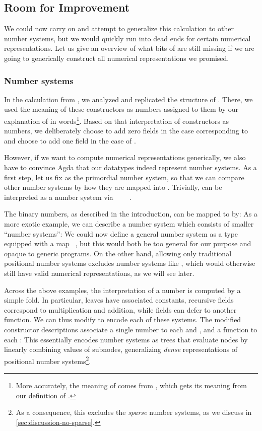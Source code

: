 \subsection{Room for Improvement}
We could now carry on and attempt to generalize this calculation to other number systems, but we would quickly run into dead ends for certain numerical representations. Let us give an overview of what bits of  are still missing if we are going to generically construct all numerical representations we promised.

\subsubsection{Number systems}\label{ssec:numbers}
In the calculation  from \bN{}, we analyzed and replicated the structure of \bN{}. There, we used the meaning of these constructors as numbers assigned to them by our explanation of \bN{} in words\footnote{More accurately, the meaning of \bN{} comes from , which gets its meaning from our definition of \AF{\_<\_}.}. Based on that interpretation of constructors as numbers, we deliberately choose to add zero fields in the case corresponding to  and choose to add one field in the case of .

However, if we want to compute numerical representations generically, we also have to convince Agda that our datatypes indeed represent number systems. As a first step, let us fix \bN{} as the primordial number system, so that we can compare other number systems by how they are mapped into \bN{}. Trivially, \bN{} can be interpreted as a number system via \ \AV{:}\ \bN{}\ \ \bN{}.

The binary numbers, as described in the introduction, can be mapped to \bN{} by:
As a more exotic example, we can describe a number system
which consists of smaller ``number systems'':
We could now define a general number system as a type  equipped with a map \ \bN{}, but this would both be too general for our purpose and opaque to generic programs. On the other hand, allowing only traditional positional number systems excludes number systems like , which would otherwise still have valid numerical representations, as we will see later.

Across the above examples, the interpretation of a number is computed by a simple fold. In particular, leaves have associated constants, recursive fields correspond to multiplication and addition, while fields can defer to another function. We can thus modify  to encode each of these systems. The modified constructor descriptions  associate a single number to each  and , and a function to each :
This essentially encodes number systems as trees that evaluate nodes by linearly combining values of subnodes, generalizing \emph{dense} representations of positional number systems\footnote{As a consequence, this excludes the \emph{sparse} number systems, as we discuss in \autoref{sec:discussion-no-sparse}.}.

